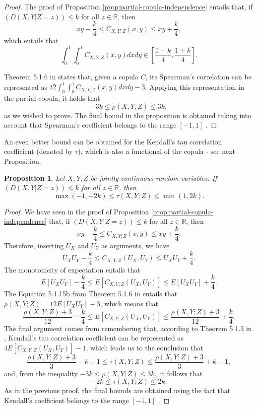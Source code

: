 \documentclass[
]{article}
\newtheorem{proposition}{Proposition}
\begin{document}
\begin{proof}
The proof of Proposition \ref{prop:partial-copula-independence} entails that, if $(D(X, Y | Z = z)) \leq k$ for all $z \in \mathbb{R}$, then
$$xy - \frac{k}{4} \leq C_{X,Y;Z}(x, y) \leq xy + \frac{k}{4},$$
which entails that
$$\int_0^1 \int_0^1 C_{X,Y;Z}(x, y) dx dy \in \left[\frac{1-k}{4}, \frac{1+k}{4}\right].$$

Theorem 5.1.6 in \citet{nelsen2006} states that, given a copula $C$, its Spearman's correlation can be represented as $12 \int_0^1 \int_0^1 C_{X,Y;Z}(x, y) dx dy - 3$. Applying this representation in the partial copula, it holds that
$$-3k \leq \rho(X, Y; Z) \leq 3k,$$
as we wished to prove. The final bound in the proposition is obtained taking into account that Spearman's coefficient belongs to the range $[-1, 1]$ \citep[see Theorem 5.1.9 in][]{nelsen2006}.
\end{proof}

An even better bound can be obtained for the Kendall's tau correlation
coefficient (denoted by \(\tau\)), which is also a functional of the
copula \citep{nelsen2006} - see next Proposition.

\begin{proposition}
Let $X, Y, Z$ be jointly continuous random variables. If $(D(X, Y | Z = z)) \leq k$ for all $z \in \mathbb{R}$, then
$$\max(-1, -2k) \leq \tau(X, Y; Z) \leq \min(1, 2k).$$
\end{proposition}

\begin{proof}
We have seen in the proof of Proposition \ref{prop:partial-copula-independence} that, if $(D(X, Y | Z = z)) \leq k$ for all $z \in \mathbb{R}$, then
$$xy - \frac{k}{4} \leq C_{X,Y;Z}(x, y) \leq xy + \frac{k}{4}.$$
Therefore, inserting $U_X$ and $U_Y$ as arguments, we have
$$U_X U_Y - \frac{k}{4} \leq C_{X,Y;Z}(U_X, U_Y) \leq U_X U_Y + \frac{k}{4}.$$
The monotonicity of expectation \citep[property E2 of section 3.3 of][]{james1981} entails that
$$E[U_X U_Y] - \frac{k}{4} \leq E[C_{X,Y;Z}(U_X, U_Y)] \leq E[U_X U_Y] + \frac{k}{4}.$$
The Equation 5.1.15b from Theorem 5.1.6 in \citet{nelsen2006} entails that $\rho(X,Y;Z) = 12 E[U_X U_Y] -3$, which means that
$$\frac{\rho(X,Y;Z) + 3}{12} - \frac{k}{4} \leq E[C_{X,Y;Z}(U_X, U_Y)] \leq \frac{\rho(X,Y;Z) + 3}{12} + \frac{k}{4}.$$
The final argument comes from remembering that, according to Theorem 5.1.3 in \citet{nelsen2006}, Kendall's tau correlation coefficient can be represented as $4E[C_{X,Y;Z}(U_X, U_Y)] - 1$, which leads us to the conclusion that
$$\frac{\rho(X,Y;Z) + 3}{3} - k -1 \leq \tau(X, Y; Z) \leq \frac{\rho(X,Y;Z) + 3}{3} + k -1,$$
and, from the inequality $-3k \leq \rho(X, Y; Z) \leq 3k,$ it follows that
$$-2k \leq \tau(X, Y; Z) \leq 2k.$$
As in the previous proof, the final bounds are obtained using the fact that Kendall's coefficient belongs to the range $[-1, 1]$ \citep[see Theorem 5.1.9 in][]{nelsen2006}.
\end{proof}
\end{document}
